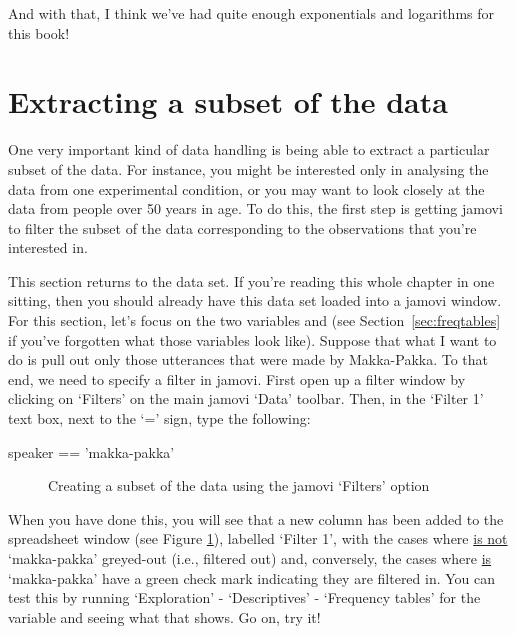 And with that, I think we've had quite enough exponentials and logarithms for this book!



\section{Extracting a subset of the data~\label{sec:subset}}

One very important kind of data handling is being able to extract a particular subset of the data. For instance, you might be interested only in analysing the data from one experimental condition, or you may want to look closely at the data from people over 50 years in age. To do this, the first step is getting jamovi to filter the subset of the data corresponding to the observations that you're interested in. 

This section returns to the  data set. If you're reading this whole chapter in one sitting, then you should already have this data set loaded into a jamovi window. For this section, let's focus on the two variables  and  (see Section~\ref{sec:freqtables} if you've forgotten what those variables look like). Suppose that what I want to do is pull out only those utterances that were made by Makka-Pakka. To that end, we need to specify a filter in jamovi. First open up a filter window by clicking on `Filters' on the main jamovi `Data' toolbar. Then, in the `Filter 1' text box, next to the `=' sign, type the following:
\begin{rblock1}
speaker == 'makka-pakka'
\end{rblock1}

\begin{figure}[htb!!]
\begin{center}
\caption{Creating a subset of the  data using the jamovi `Filters' option}
\label{fig:subset1}
\HR
\end{center}
\end{figure}

When you have done this, you will see that a new column has been added to the spreadsheet window (see Figure \ref{fig:subset1}), labelled `Filter 1', with the cases where  \underline{is not} `makka-pakka' greyed-out (i.e., filtered out) and, conversely, the cases where  \underline{is} `makka-pakka' have a green check mark indicating they are filtered in. You can test this by running `Exploration' - `Descriptives' - `Frequency tables' for the  variable and seeing what that shows. Go on, try it!


